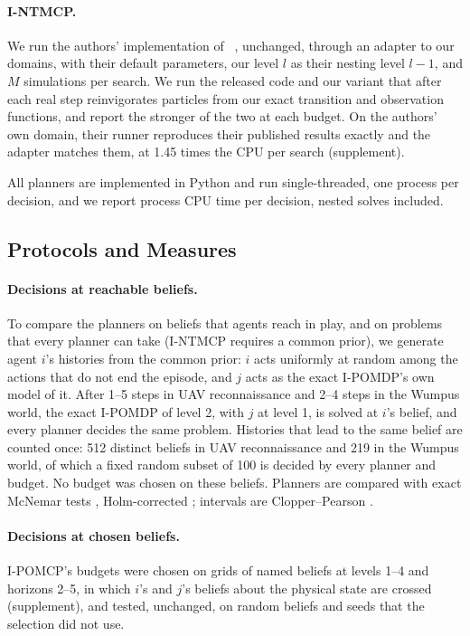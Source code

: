 \documentclass{article}
\newcommand{\citet}[1]{\citeauthor{#1}~\shortcite{#1}}
\begin{document}
\paragraph{I-NTMCP.} We run the authors' implementation of \citet{schwartz2022online}, unchanged, through an adapter to our domains, with their default parameters, our level $l$ as their nesting level $l-1$, and $M$ simulations per search. We run the released code and our variant that after each real step reinvigorates particles from our exact transition and observation functions, and report the stronger of the two at each budget. On the authors' own domain, their runner reproduces their published results exactly and the adapter matches them, at 1.45 times the CPU per search (supplement).

All planners are implemented in Python and run single-threaded, one process per decision, and we report process CPU time per decision, nested solves included.

\subsection{Protocols and Measures}

\paragraph{Decisions at reachable beliefs.} To compare the planners on beliefs that agents reach in play, and on problems that every planner can take (I-NTMCP requires a common prior), we generate agent $i$'s histories from the common prior: $i$ acts uniformly at random among the actions that do not end the episode, and $j$ acts as the exact I-POMDP's own model of it. After 1--5 steps in UAV reconnaissance and 2--4 steps in the Wumpus world, the exact I-POMDP of level 2, with $j$ at level 1, is solved at $i$'s belief, and every planner decides the same problem. Histories that lead to the same belief are counted once: 512 distinct beliefs in UAV reconnaissance and 219 in the Wumpus world, of which a fixed random subset of 100 is decided by every planner and budget. No budget was chosen on these beliefs. Planners are compared with exact McNemar tests \cite{mcnemar1947note}, Holm-corrected \cite{holm1979simple}; intervals are Clopper--Pearson \cite{clopper1934use}.

\paragraph{Decisions at chosen beliefs.} I-POMCP's budgets were chosen on grids of named beliefs at levels 1--4 and horizons 2--5, in which $i$'s and $j$'s beliefs about the physical state are crossed (supplement), and tested, unchanged, on random beliefs and seeds that the selection did not use.
\end{document}
